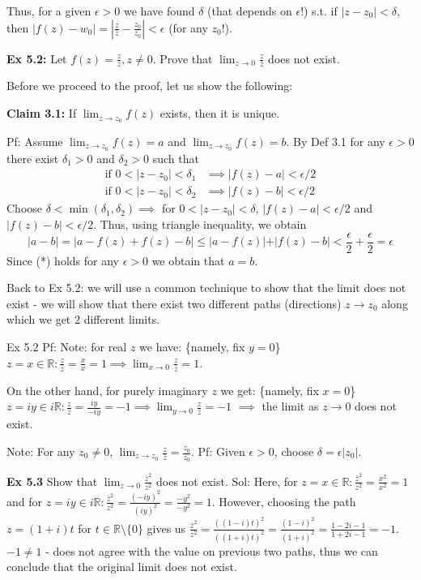\documentclass{article}
\begin{document}
Thus, for a given $\epsilon > 0$ we have found $\delta$ (that depends on $\epsilon$!) s.t. if $\vert z - z_0\vert  < \delta$, then $\vert f(z) - w_0\vert  = \left\vert \frac{z}{\bar{z}} - \frac{z_0}{\bar{z_0}}\right\vert  < \epsilon$ (for any $z_0$!).

\textbf{Ex 5.2:} Let $f(z) = \frac{z}{\bar{z}}, z \neq 0$. Prove that $\lim_{z \to 0} \frac{z}{\bar{z}}$ does not exist.

Before we proceed to the proof, let us show the following:

\textbf{Claim 3.1:} If $\lim_{z \to z_0} f(z)$ exists, then it is unique.

Pf: Assume $\lim_{z \to z_0} f(z) = a$ and $\lim_{z \to z_0} f(z) = b$. By Def 3.1 for any $\epsilon > 0$ there exist $\delta_1 > 0$ and $\delta_2 > 0$ such that
\begin{align*}
\text{if } 0 < \vert z - z_0\vert  < \delta_1 &\implies \vert f(z) - a\vert  < \epsilon/2 \\
\text{if } 0 < \vert z - z_0\vert  < \delta_2 &\implies \vert f(z) - b\vert  < \epsilon/2
\end{align*}
Choose $\delta < \min(\delta_1, \delta_2) \implies$ for $0 < \vert z - z_0\vert  < \delta$, $\vert f(z) - a\vert  < \epsilon/2$ and $\vert f(z) - b\vert  < \epsilon/2$. Thus, using triangle inequality, we obtain
$$\vert a - b\vert  = \vert a - f(z) + f(z) - b\vert  \leq \vert a - f(z)\vert  + \vert f(z) - b\vert  < \frac{\epsilon}{2} + \frac{\epsilon}{2} = \epsilon$$
Since (*) holds for any $\epsilon > 0$ we obtain that $a = b$.

Back to Ex 5.2: we will use a common technique to show that the limit does not exist - we will show that there exist two different paths (directions) $z \to z_0$ along which we get 2 different limits.

Ex 5.2 Pf: Note: for real $z$ we have: \{namely, fix $y = 0$\}
$z = x \in \mathbb{R}: \frac{z}{\bar{z}} = \frac{x}{x} = 1 \implies \lim_{x \to 0} \frac{z}{\bar{z}} = 1$.

On the other hand, for purely imaginary $z$ we get: \{namely, fix $x = 0$\}
$z = iy \in i\mathbb{R}: \frac{z}{\bar{z}} = \frac{iy}{-iy} = -1 \implies \lim_{y \to 0} \frac{z}{\bar{z}} = -1$
$\implies$ the limit as $z \to 0$ does not exist.

Note: For any $z_0 \neq 0$, $\lim_{z \to z_0} \frac{z}{\bar{z}} = \frac{z_0}{\bar{z_0}}$. Pf: Given $\epsilon > 0$, choose $\delta = \epsilon \vert z_0\vert $.

\textbf{Ex 5.3} Show that $\lim_{z \to 0} \frac{\bar{z}^2}{z^2}$ does not exist.
Sol: Here, for $z = x \in \mathbb{R}:  \frac{\bar{z}^2}{z^2} = \frac{x^2}{x^2} = 1$ and for $z=iy \in i\mathbb{R}: \frac{\bar{z}^2}{z^2} = \frac{(-iy)^2}{(iy)^2} = \frac{-y^2}{-y^2}=1$. However, choosing the path $z=(1+i)t$ for $t \in \mathbb{R} \setminus \{0\}$ gives us $\frac{\bar{z}^2}{z^2}=\frac{((1-i)t)^2}{((1+i)t)^2} = \frac{(1-i)^2}{(1+i)^2} = \frac{1-2i-1}{1+2i-1}=-1$. $-1 \neq 1$ - does not agree with the value on previous two paths, thus we can conclude that the original limit does not exist.
\end{document}
